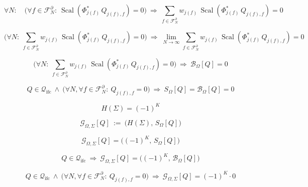 \documentclass[12pt]{article}
\begin{document}
\begin{equation}
\forall N:\quad \Big(\forall f\in\mathcal{F}_N^\partial:\ \operatorname{Scal}\!\left(\Phi_{j(f)}^*\,Q_{j(f),f}\right)=0\Big)\ \Longrightarrow\ \sum_{f\in\mathcal{F}_N^\partial} w_{j(f)}\,\operatorname{Scal}\!\left(\Phi_{j(f)}^*\,Q_{j(f),f}\right)=0
\end{equation}

\begin{equation}
\Big(\forall N:\ \sum_{f\in\mathcal{F}_N^\partial} w_{j(f)}\,\operatorname{Scal}\!\left(\Phi_{j(f)}^*\,Q_{j(f),f}\right)=0\Big)\ \Longrightarrow\ \lim_{N\to\infty}\sum_{f\in\mathcal{F}_N^\partial} w_{j(f)}\,\operatorname{Scal}\!\left(\Phi_{j(f)}^*\,Q_{j(f),f}\right)=0
\end{equation}

\begin{equation}
\Big(\forall N:\ \sum_{f\in\mathcal{F}_N^\partial} w_{j(f)}\,\operatorname{Scal}\!\left(\Phi_{j(f)}^*\,Q_{j(f),f}\right)=0\Big)\ \Longrightarrow\ \mathcal{B}_\Omega[Q]=0
\end{equation}

\begin{equation}
Q\in\mathcal{Q}_{\mathrm{ifc}}\ \wedge\ \Big(\forall N,\forall f\in\mathcal{F}_N^\partial:\ Q_{j(f),f}=0\Big)\ \Longrightarrow\ S_\Omega[Q]=\mathcal{B}_\Omega[Q]=0
\end{equation}

\begin{equation}
H(\Sigma)=(-1)^K
\end{equation}

\begin{equation}
\mathcal{G}_{\Omega,\Sigma}[Q]\ :=\ \bigl(H(\Sigma),\,S_\Omega[Q]\bigr)
\end{equation}

\begin{equation}
\mathcal{G}_{\Omega,\Sigma}[Q]=\bigl((-1)^K,\,S_\Omega[Q]\bigr)
\end{equation}

\begin{equation}
Q\in\mathcal{Q}_{\mathrm{ifc}}\ \Longrightarrow\ \mathcal{G}_{\Omega,\Sigma}[Q]=\bigl((-1)^K,\,\mathcal{B}_\Omega[Q]\bigr)
\end{equation}

\begin{equation}
Q\in\mathcal{Q}_{\mathrm{ifc}}\ \wedge\ \Big(\forall N,\forall f\in\mathcal{F}_N^\partial:\ Q_{j(f),f}=0\Big)\ \Longrightarrow\ \mathcal{G}_{\Omega,\Sigma}[Q]=(-1)^K\cdot 0
\end{equation}
\end{document}
